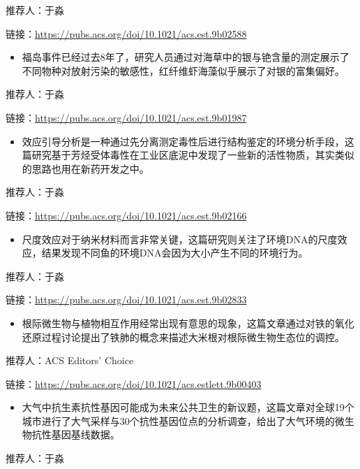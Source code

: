 \documentclass[]{book}
\providecommand{\tightlist}{%
  \setlength{\itemsep}{0pt}\setlength{\parskip}{0pt}}
\begin{document}
推荐人：于淼

链接：\url{https://pubs.acs.org/doi/10.1021/acs.est.9b02588}

\begin{itemize}
\tightlist
\item
  福岛事件已经过去8年了，研究人员通过对海草中的银与铯含量的测定展示了不同物种对放射污染的敏感性，红纤维虾海藻似乎展示了对银的富集偏好。
\end{itemize}

推荐人：于淼

链接：\url{https://pubs.acs.org/doi/10.1021/acs.est.9b01987}

\begin{itemize}
\tightlist
\item
  效应引导分析是一种通过先分离测定毒性后进行结构鉴定的环境分析手段，这篇研究基于芳烃受体毒性在工业区底泥中发现了一些新的活性物质，其实类似的思路也用在新药开发之中。
\end{itemize}

推荐人：于淼

链接：\url{https://pubs.acs.org/doi/10.1021/acs.est.9b02166}

\begin{itemize}
\tightlist
\item
  尺度效应对于纳米材料而言非常关键，这篇研究则关注了环境DNA的尺度效应，结果发现不同鱼的环境DNA会因为大小产生不同的环境行为。
\end{itemize}

推荐人：于淼

链接：\url{https://pubs.acs.org/doi/10.1021/acs.est.9b02833}

\begin{itemize}
\tightlist
\item
  根际微生物与植物相互作用经常出现有意思的现象，这篇文章通过对铁的氧化还原过程讨论提出了铁肺的概念来描述大米根对根际微生物生态位的调控。
\end{itemize}

推荐人：ACS Editors' Choice

链接：\url{https://pubs.acs.org/doi/10.1021/acs.estlett.9b00403}

\begin{itemize}
\tightlist
\item
  大气中抗生素抗性基因可能成为未来公共卫生的新议题，这篇文章对全球19个城市进行了大气采样与30个抗性基因位点的分析调查，给出了大气环境的微生物抗性基因基线数据。
\end{itemize}

推荐人：于淼
\end{document}
